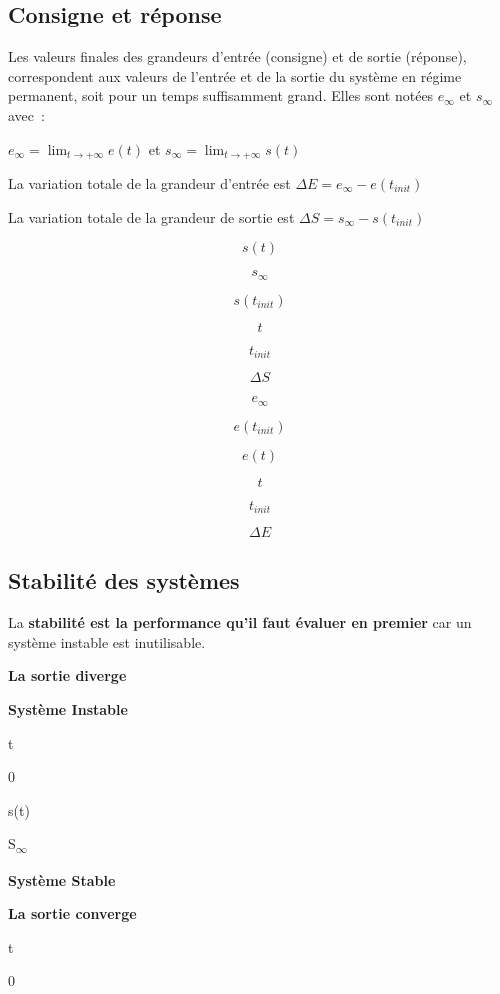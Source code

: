 \subsection{Consigne et réponse}\label{consigne-et-ruxe9ponse}

Les valeurs finales des grandeurs d'entrée (consigne) et de sortie
(réponse), correspondent aux valeurs de l'entrée et de la sortie du
système en régime permanent, soit pour un temps suffisamment grand.
Elles sont notées \(e_{\infty}\) et \(s_{\infty}\) avec~:

\(e_{\infty} = \lim_{t \rightarrow + \infty}{e(t)}\) et
\(s_{\infty} = \lim_{t \rightarrow + \infty}{s(t)}\)

La variation totale de la grandeur d'entrée est
\(\Delta E = e_{\infty} - e\left( t_{init} \right)\)

La variation totale de la grandeur de sortie est
\(\Delta S = s_{\infty} - s(t_{init})\)

\[s(t)\]

\[s_{\infty}
\]

\[s(t_{init})\]

\[t\]

\[t_{init}\]

\[\Delta S\]

\[e_{\infty}\]

\[
{e\left( t_{init} \right)}\]

\[e(t)\]

\[t\]

\[t_{init}\]

\[\Delta E\]

\subsection{Stabilité des
systèmes}\label{stabilituxe9-des-systuxe8mes}

La \textbf{stabilité est la performance qu'il faut évaluer en premier}
car un système instable est inutilisable.

\textbf{La sortie diverge}

\textbf{Système Instable}

t

0

s(t)

S\textsubscript{$\infty$}

\textbf{Système Stable}

\textbf{La sortie converge}

t

0

